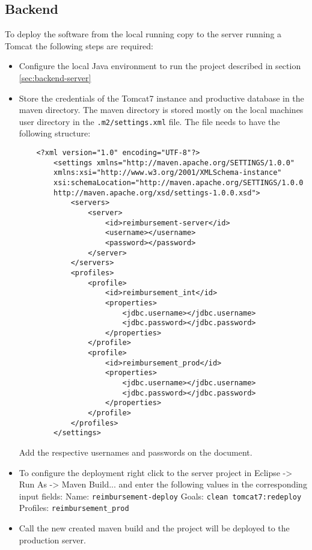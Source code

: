 \subsection{Backend}

To deploy the software from the local running copy to the server running a Tomcat the following steps are required:

\begin{itemize}
    \item Configure the local Java environment to run the project described in section \ref{sec:backend-server} 
    \item Store the credentials of the Tomcat7 instance and productive database in the maven directory. The maven directory is stored mostly on the local machines user directory in the \texttt{.m2/settings.xml} file. The file needs to have the following structure:

    \begin{lstlisting}
    <?xml version="1.0" encoding="UTF-8"?>
        <settings xmlns="http://maven.apache.org/SETTINGS/1.0.0"
        xmlns:xsi="http://www.w3.org/2001/XMLSchema-instance"
        xsi:schemaLocation="http://maven.apache.org/SETTINGS/1.0.0      
        http://maven.apache.org/xsd/settings-1.0.0.xsd">
        	<servers>
        		<server>
        			<id>reimbursement-server</id>
        			<username></username>
        			<password></password>
        		</server>
        	</servers>
        	<profiles>
        		<profile>
        			<id>reimbursement_int</id>
        			<properties>
        				<jdbc.username></jdbc.username>
        				<jdbc.password></jdbc.password>
        			</properties>
        		</profile>
        		<profile>
        			<id>reimbursement_prod</id>
        			<properties>
        				<jdbc.username></jdbc.username>
        				<jdbc.password></jdbc.password>
        			</properties>
        		</profile>
        	</profiles>
        </settings>
    \end{lstlisting}
    
    Add the respective usernames and passwords on the document.
    
    \item To configure the deployment right click to the server project in Eclipse -> Run As -> Maven Build... and enter the following values in the corresponding input fields:
    \newline
    Name: \texttt{reimbursement-deploy}
    \newline
    Goals: \texttt{clean tomcat7:redeploy}
    \newline
    Profiles: \texttt{reimbursement\_prod}
    \item Call the new created maven build and the project will be deployed to the production server.  
    
\end{itemize}
    
